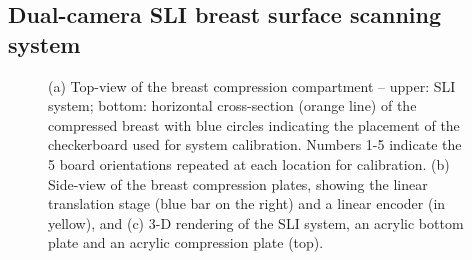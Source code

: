 \subsection{Dual-camera SLI breast surface scanning system}
\label{sec:sli}
\begin{figure}
	\begin{center}
	\end{center}
	\caption{ (a) Top-view of the breast compression compartment -- upper: \ac{SLI} system; bottom: horizontal cross-section (orange line) of the compressed breast with blue circles indicating the placement of the checkerboard used for system calibration. Numbers 1-5 indicate the 5 board orientations repeated at each location for calibration. (b) Side-view of the breast compression plates, showing the linear translation stage (blue bar on the right) and a linear encoder (in yellow), and  (c) 3-D rendering of the \ac{SLI} system, an acrylic bottom plate and an acrylic compression plate (top). } 
	\label{fig:mammographysetup}
\end{figure} 

